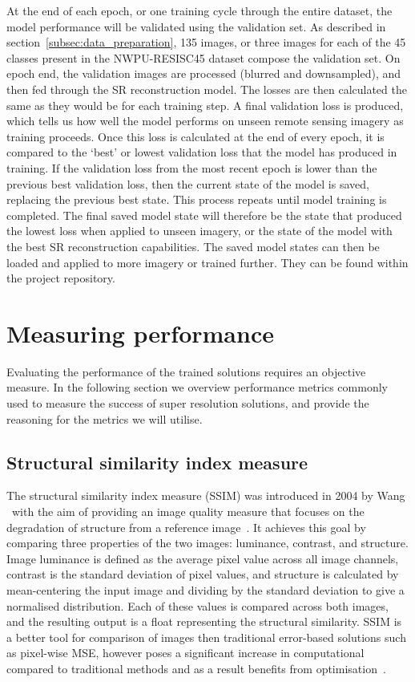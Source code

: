 At the end of each epoch, or one training cycle through the entire dataset, the model performance will be validated using the validation set. As described in section~\ref{subsec:data_preparation}, 135 images, or three images for each of the 45 classes present in the NWPU-RESISC45 dataset compose the validation set. On epoch end, the validation images are processed (blurred and downsampled), and then fed through the SR reconstruction model. The losses are then calculated the same as they would be for each training step. A final validation loss is produced, which tells us how well the model performs on unseen remote sensing imagery as training proceeds. Once this loss is calculated at the end of every epoch, it is compared to the `best' or lowest validation loss that the model has produced in training. If the validation loss from the most recent epoch is lower than the previous best validation loss, then the current state of the model is saved, replacing the previous best state. This process repeats until model training is completed. The final saved model state will therefore be the state that produced the lowest loss when applied to unseen imagery, or the state of the model with the best SR reconstruction capabilities. The saved model states can then be loaded and applied to more imagery or trained further. They can be found within the project repository.

\section{Measuring performance}\label{sec:measuring_performance}
Evaluating the performance of the trained solutions requires an objective measure. In the following section we overview performance metrics commonly used to measure the success of super resolution solutions, and provide the reasoning for the metrics we will utilise.

\subsection{Structural similarity index measure}
The structural similarity index measure (SSIM) was introduced in 2004 by Wang \etal\ with the aim of providing an image quality measure that focuses on the degradation of structure from a reference image~\cite{ssim}. It achieves this goal by comparing three properties of the two images: luminance, contrast, and structure. Image luminance is defined as the average pixel value across all image channels, contrast is the standard deviation of pixel values, and structure is calculated by mean-centering the input image and dividing by the standard deviation to give a normalised distribution. Each of these values is compared across both images, and the resulting output is a float representing the structural similarity. SSIM is a better tool for comparison of images then traditional error-based solutions such as pixel-wise MSE, however poses a significant increase in computational compared to traditional methods and as a result benefits from optimisation~\cite{ssim}.

